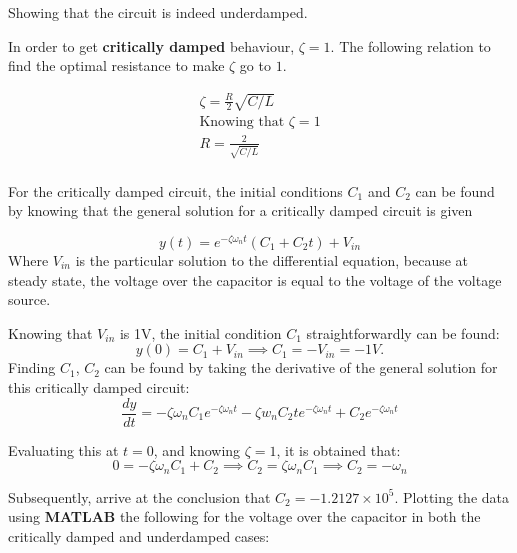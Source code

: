 Showing that the circuit is indeed underdamped.

In order to get {\bf critically damped} behaviour, $\zeta = 1$. The following relation to find the optimal resistance to make $\zeta$ go to $1$.

\begin{equation}
    \begin{gathered}
        \zeta = \frac{R}{2} \sqrt{C/L} \\
        \text{Knowing that $\zeta = 1$} \\
        R = \frac{2}{\sqrt{C/L}} \\
    \end{gathered}
\end{equation}

For the critically damped circuit, the initial
conditions $C_1$ and $C_2$ can be found by knowing that the general solution
for a critically damped circuit is given

\begin{equation}
    y(t) = e^{-\zeta \omega_n t}\left(C_1 + C_2 t\right) + V_{in}
\end{equation}
Where $V_{in}$ is the particular solution to the differential equation, because at steady state, the voltage over the capacitor is equal to the voltage of the voltage source.

Knowing that $V_{in}$ is 1V, the initial condition $C_1$ straightforwardly can be found:
\begin{equation}
    y(0) = C_1 + V_{in} \implies C_1 = -V_{in} = -1V.
\end{equation}
Finding $C_1$, $C_2$ can be found by taking the derivative
of the general solution for this critically damped circuit:
\begin{equation}
    \frac{dy}{dt} = -\zeta \omega_n C_1 e^{-\zeta \omega_n t} - \zeta w_n C_2 t e^{-\zeta \omega_n t} + C_2 e^{-\zeta \omega_n t}
\end{equation}

Evaluating this at $t=0$, and knowing $\zeta = 1$, it is obtained that:
\begin{equation}
    0 = -\zeta \omega_n C_1 + C_2 \implies C_2 = \zeta \omega_n C_1 \implies C_2 = -\omega_n
\end{equation}

Subsequently, arrive at the conclusion that $C_2 = -1.2127\times10^5$.
Plotting the data using {\bf MATLAB} the following for the voltage over the capacitor in both the critically damped and underdamped cases:

